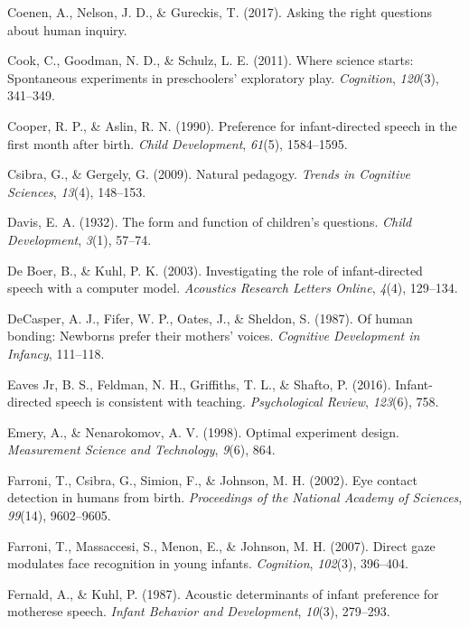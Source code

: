 \documentclass[a4paper,man,apacite,floatsintext]{apa6}
\begin{document}
\hypertarget{ref-coenen2017asking}{}
Coenen, A., Nelson, J. D., \& Gureckis, T. (2017). Asking the right
questions about human inquiry.

\hypertarget{ref-cook2011science}{}
Cook, C., Goodman, N. D., \& Schulz, L. E. (2011). Where science starts:
Spontaneous experiments in preschoolers' exploratory play.
\emph{Cognition}, \emph{120}(3), 341--349.

\hypertarget{ref-cooper1990preference}{}
Cooper, R. P., \& Aslin, R. N. (1990). Preference for infant-directed
speech in the first month after birth. \emph{Child Development},
\emph{61}(5), 1584--1595.

\hypertarget{ref-csibra2009natural}{}
Csibra, G., \& Gergely, G. (2009). Natural pedagogy. \emph{Trends in
Cognitive Sciences}, \emph{13}(4), 148--153.

\hypertarget{ref-davis1932form}{}
Davis, E. A. (1932). The form and function of children's questions.
\emph{Child Development}, \emph{3}(1), 57--74.

\hypertarget{ref-de2003investigating}{}
De Boer, B., \& Kuhl, P. K. (2003). Investigating the role of
infant-directed speech with a computer model. \emph{Acoustics Research
Letters Online}, \emph{4}(4), 129--134.

\hypertarget{ref-decasper1987human}{}
DeCasper, A. J., Fifer, W. P., Oates, J., \& Sheldon, S. (1987). Of
human bonding: Newborns prefer their mothers' voices. \emph{Cognitive
Development in Infancy}, 111--118.

\hypertarget{ref-eaves2016infant}{}
Eaves Jr, B. S., Feldman, N. H., Griffiths, T. L., \& Shafto, P. (2016).
Infant-directed speech is consistent with teaching. \emph{Psychological
Review}, \emph{123}(6), 758.

\hypertarget{ref-emery1998optimal}{}
Emery, A., \& Nenarokomov, A. V. (1998). Optimal experiment design.
\emph{Measurement Science and Technology}, \emph{9}(6), 864.

\hypertarget{ref-farroni2002eye}{}
Farroni, T., Csibra, G., Simion, F., \& Johnson, M. H. (2002). Eye
contact detection in humans from birth. \emph{Proceedings of the
National Academy of Sciences}, \emph{99}(14), 9602--9605.

\hypertarget{ref-farroni2007direct}{}
Farroni, T., Massaccesi, S., Menon, E., \& Johnson, M. H. (2007). Direct
gaze modulates face recognition in young infants. \emph{Cognition},
\emph{102}(3), 396--404.

\hypertarget{ref-fernald1987acoustic}{}
Fernald, A., \& Kuhl, P. (1987). Acoustic determinants of infant
preference for motherese speech. \emph{Infant Behavior and Development},
\emph{10}(3), 279--293.
\end{document}
